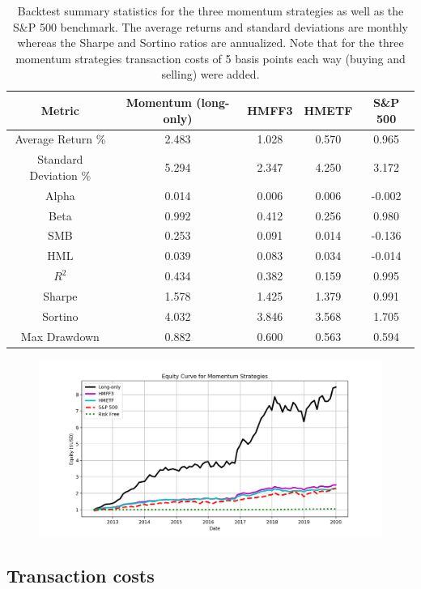 \documentclass[10pt, letterpaper]{article}
\begin{document}
\begin{table}[H]
\centering
\begin{tabular}{c | c | c | c | c}
Metric & Momentum (long-only) & HMFF3 & HMETF & S\&P 500 \\
\hline
Average Return \% & 2.483 & 1.028 &  0.570 & 0.965 \\
Standard Deviation \% & 5.294 & 2.347 & 4.250 & 3.172 \\
Alpha & 0.014 & 0.006 & 0.006 & -0.002 \\
Beta & 0.992 & 0.412 & 0.256 & 0.980 \\
SMB & 0.253 & 0.091 & 0.014 & -0.136 \\
HML & 0.039 & 0.083 & 0.034 & -0.014 \\
$R^2$ & 0.434 &  0.382 & 0.159 & 0.995\\
Sharpe & 1.578 & 1.425 & 1.379 & 0.991  \\
Sortino & 4.032 & 3.846 & 3.568 &  1.705 \\
Max Drawdown & 0.882 & 0.600 & 0.563 & 0.594
\end{tabular}
\caption{Backtest summary statistics for the three momentum strategies as well as the S\&P 500 benchmark.  The average returns and standard deviations are monthly whereas the Sharpe and Sortino ratios are annualized.  Note that for the three momentum strategies transaction costs of 5 basis points each way (buying and selling) were added.}
\label{table:summarystats}
\end{table}


\begin{figure}[H]
\centering
\includegraphics[width=\textwidth]{comparison.png}
\caption{}
\label{fig:comparison}
\end{figure}



\subsection{Transaction costs}
\end{document}
